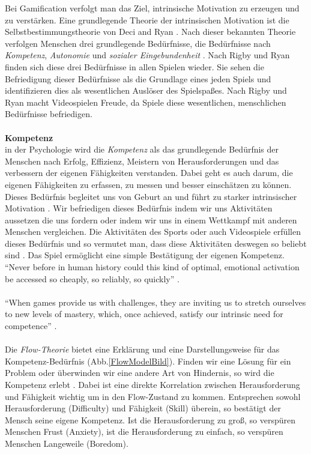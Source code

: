 \documentclass[a4paper,12pt]{scrartcl}
\begin{document}
Bei Gamification verfolgt man das Ziel, intrinsische Motivation zu erzeugen und zu verstärken. Eine grundlegende Theorie der intrinsischen Motivation ist die Selbstbestimmungstheorie von Deci and Ryan \cite{Ryan2000}. Nach dieser bekannten Theorie verfolgen Menschen drei grundlegende Bedürfnisse, die Bedürfnisse nach \textit{Kompetenz}, \textit{Autonomie} und \textit{sozialer Eingebundenheit} \cite{Rheinberg2006}. Nach Rigby und Ryan \cite{Rigby2011} finden sich diese drei Bedürfnisse in allen Spielen wieder. Sie sehen die Befriedigung dieser Bedürfnisse als die Grundlage eines jeden Spiels und identifizieren dies als wesentlichen Auslöser des Spielspaßes. Nach Rigby und Ryan \cite{Rigby2011} macht Videospielen Freude, da Spiele diese wesentlichen, menschlichen Bedürfnisse befriedigen.
\\\\
\textbf{Kompetenz}\\
in der Psychologie wird die \textit{Kompetenz} als das grundlegende Bedürfnis der Menschen nach Erfolg, Effizienz, Meistern von Herausforderungen und das verbessern der eigenen Fähigkeiten verstanden. Dabei geht es auch darum, die eigenen Fähigkeiten zu erfassen, zu messen und besser einschätzen zu können. Dieses Bedürfnis begleitet uns von Geburt an und führt zu starker intrinsischer Motivation \cite{Rigby2011}. Wir befriedigen dieses Bedürfnis indem wir uns Aktivitäten aussetzen die uns fordern oder indem wir uns in einem Wettkampf mit anderen Menschen vergleichen. Die Aktivitäten des Sports oder auch Videospiele erfüllen dieses Bedürfnis und so vermutet man, dass diese Aktivitäten deswegen so beliebt sind \cite{Mcgonigal2011}\cite{Rigby2011}\cite{Mayer2009}. Das Spiel ermöglicht eine simple Bestätigung der eigenen Kompetenz.
\enquote{Never before in human history could this kind of optimal, emotional activation be accessed so cheaply, so reliably, so quickly} \cite{Mcgonigal2011}.
\\\\
\enquote{When games provide us with challenges, they are inviting us to stretch ourselves to new levels of mastery, which, once achieved, satisfy our intrinsic need for competence} \cite{Rigby2011}. 
\\\\
Die \textit{Flow-Theorie} bietet eine Erklärung und eine Darstellungsweise für das Kompetenz-Bedürfnis (Abb.\ref{FlowModelBild}). Finden wir eine Lösung für ein Problem oder überwinden wir eine andere Art von Hindernis, so wird die Kompetenz erlebt \cite{Csikszentmihalyi2017}. Dabei ist eine direkte Korrelation zwischen Herausforderung und Fähigkeit wichtig um in den Flow-Zustand zu kommen. Entsprechen sowohl Herausforderung (Difficulty) und Fähigkeit (Skill) überein, so bestätigt der Mensch seine eigene Kompetenz. Ist die Herausforderung zu groß, so verspüren Menschen Frust (Anxiety), ist die Herausforderung zu einfach, so verspüren Menschen Langeweile (Boredom).
\end{document}
